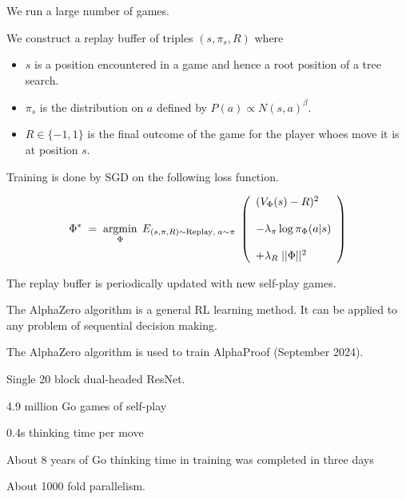 {

We run a large number of games.

\vfill
We construct a replay buffer of triples $(s,\pi_{s},R)$ where

\vfill
\begin{itemize}
\item $s$ is a position encountered in a game and hence a root position of a tree search.

\vfill
\item $\pi_{s}$ is the distribution on $a$ defined by $P(a) \propto N(s,a)^\beta$.

\vfill
\item $R \in \{-1,1\}$ is the final outcome of the game for the player whoes move it is at position $s$.
\end{itemize}


\vfill
Training is done by SGD on the following loss function.

$$\Phi^*\; = \;\operatorname*{argmin}_\Phi \;E_{(s,\pi,R) \sim \mathrm{Replay},\;a \sim \pi}\;\left(\begin{array}{l} (V_\Phi(s) - R)^2 \\ \\ - \lambda_\pi\log \pi_\Phi(a|s) \\ \\ + \lambda_R\;||\Phi||^2\end{array}\right)$$

\vfill
The replay buffer is periodically updated with new self-play games.


The AlphaZero algorithm is a general RL learning method.  It can be applied to any problem of sequential decision making.

\vfill
The AlphaZero algorithm is used to train AlphaProof (September 2024).



Single 20 block dual-headed ResNet.

\vfill
4.9 million Go games of self-play

\vfill
0.4s thinking time per move

\vfill
About 8 years of Go thinking time in training was completed in three days

\vfill
About 1000 fold parallelism.


}
